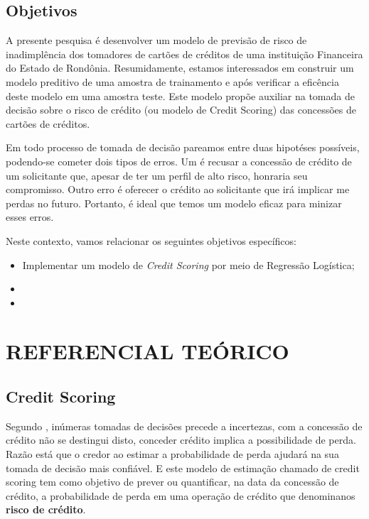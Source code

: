 \documentclass[
	12pt,				%
	openright,			%
	oneside,      %
	a4paper,			%
	english,			%
	french,				%
	spanish,			%
	brazil,				%
	]{abntex2}\usepackage[]{graphicx}\usepackage[table]{xcolor}
\theoremstyle{definition}
\begin{document}
  \section{Objetivos}

A presente pesquisa é desenvolver um modelo de previsão de risco de inadimplência dos tomadores de cartões de créditos de uma instituição Financeira do Estado de Rondônia. Resumidamente, estamos interessados em construir um modelo preditivo de uma amostra de trainamento e após verificar a eficência deste modelo em uma amostra teste. Este modelo propõe auxiliar na tomada de decisão sobre o risco de crédito (ou modelo de Credit Scoring) das concessões de cartões de créditos.

Em todo processo de tomada de decisão pareamos entre duas hipotéses possíveis, podendo-se cometer dois tipos de erros. Um é recusar a concessão de crédito de um solicitante que, apesar de ter um perfil de alto risco, honraria seu compromisso. Outro erro é oferecer o crédito ao solicitante que irá implicar me perdas no futuro. Portanto, é ideal que temos um modelo eficaz para minizar esses erros.

Neste contexto, vamos relacionar os seguintes objetivos específicos:

\begin{itemize}
  \item Implementar um modelo de \textit{Credit Scoring} por meio de Regressão Logística;
  \item 
  \item 
\end{itemize}


\chapter{REFERENCIAL TEÓRICO}


  \section{Credit Scoring}
  
Segundo \cite{sicsu2010credit}, inúmeras tomadas de decisões precede a incertezas, com a concessão de crédito não se destingui disto, conceder crédito implica a possibilidade de perda. Razão está que o 
credor ao estimar a probabilidade de perda ajudará na sua tomada de decisão mais confiável. E este modelo de estimação chamado de credit scoring tem como objetivo de prever ou quantificar, na data da concessão de crédito, a probabilidade de perda em uma operação de crédito que denominanos \textbf{risco de crédito}. 
  
\end{document}
